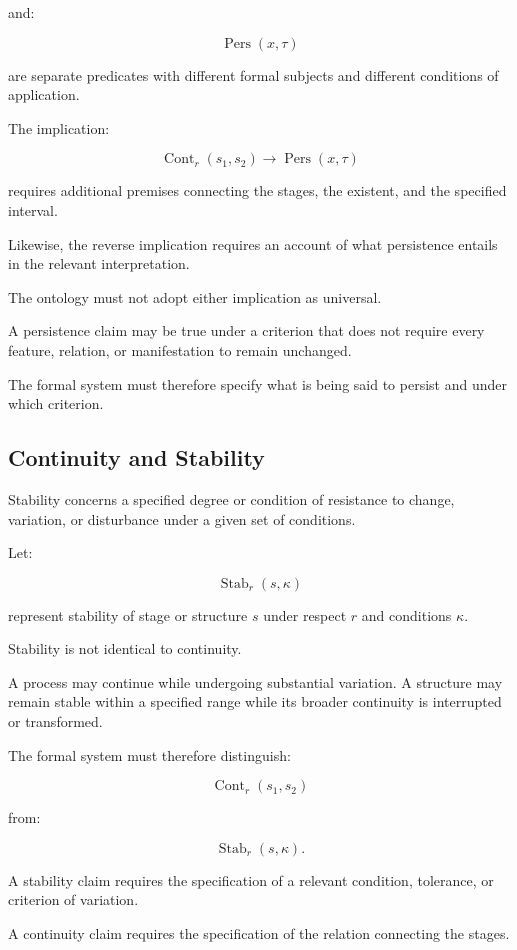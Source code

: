 and:

\[
    \operatorname{Pers}(x,\tau)
\]

are separate predicates with
different formal subjects and
different conditions of application.

The implication:

\[
    \operatorname{Cont}_{r}(s_1,s_2)
    \rightarrow
    \operatorname{Pers}(x,\tau)
\]

requires additional premises connecting
the stages, the existent, and the
specified interval.

Likewise, the reverse implication
requires an account of what
persistence entails in the relevant
interpretation.

The ontology must not adopt either
implication as universal.

A persistence claim may be true
under a criterion that does not
require every feature, relation,
or manifestation to remain
unchanged.

The formal system must therefore
specify what is being said to
persist and under which criterion.

\subsection{Continuity and Stability}

Stability concerns a specified
degree or condition of resistance
to change, variation, or disturbance
under a given set of conditions.

Let:

\[
    \operatorname{Stab}_{r}(s,\kappa)
\]

represent stability of stage or
structure \(s\) under respect \(r\)
and conditions \(\kappa\).

Stability is not identical to
continuity.

A process may continue while
undergoing substantial variation.
A structure may remain stable
within a specified range while
its broader continuity is interrupted
or transformed.

The formal system must therefore
distinguish:

\[
    \operatorname{Cont}_{r}(s_1,s_2)
\]

from:

\[
    \operatorname{Stab}_{r}(s,\kappa).
\]

A stability claim requires
the specification of a relevant
condition, tolerance, or criterion
of variation.

A continuity claim requires
the specification of the relation
connecting the stages.

